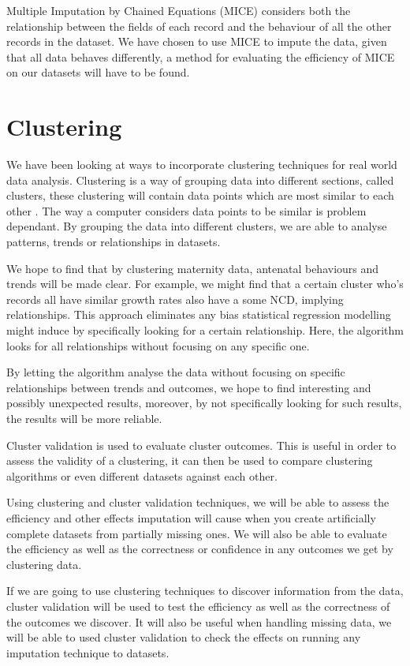 \documentclass[bsc]{abdnthesis}
\begin{document}
Multiple Imputation by Chained Equations (MICE) \cite{imp-mice} considers both the relationship between the fields of each record and the behaviour of all the other records in the dataset. We have chosen to use MICE to impute the data, given that all data behaves differently, a method for evaluating the efficiency of MICE on our datasets will have to be found. 
\section{Clustering} %
\label{sec:clustering}
We have been looking at ways to incorporate clustering techniques for real world data analysis.  Clustering is a way of grouping data into different sections, called clusters, these clustering will contain data points which are most similar to each other \cite{ cluster}. The way a computer considers data points to be similar is problem dependant. By grouping the data into different clusters, we are able to analyse patterns, trends or relationships in datasets. 

We hope to find that by clustering maternity data, antenatal behaviours and trends will be made clear. For example, we might find that a certain cluster who's records all have similar growth rates also have a some NCD, implying relationships. This approach eliminates any bias statistical regression modelling might induce by specifically looking for a certain relationship. Here, the algorithm looks for all relationships without focusing on any specific one. 

By letting the algorithm analyse the data without focusing on specific relationships between trends and outcomes, we hope to find interesting and possibly unexpected results, moreover, by not specifically looking for such results, the results will be more reliable. 

Cluster validation is used to evaluate cluster outcomes\cite{ cluster-val}. This is useful in order to assess the validity of a clustering, it can then be used to compare clustering algorithms or even different datasets against each other. 

Using clustering and cluster validation techniques, we will be able to assess the efficiency and other effects imputation will cause when you create artificially complete datasets from partially missing ones. We will also be able to evaluate the efficiency as well as the correctness or confidence in any outcomes we get by clustering data. 

If we are going to use clustering techniques to discover information from the data, cluster validation will be used to test the efficiency as well as the correctness of the outcomes we discover. It will also be useful when handling missing data, we will be able to used cluster validation to check the effects on running any imputation technique to datasets.
\end{document}

